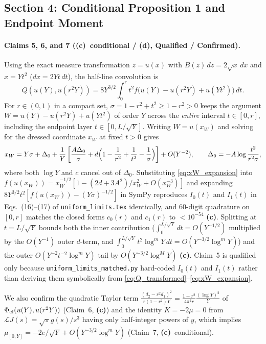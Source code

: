 \documentclass[11pt,a4paper]{article}
\newcommand{\C}{\textbf{(c)}}
\newcommand{\D}{\textbf{(d)}}
\newcommand{\scr}[1]{\texttt{#1}}
\begin{document}
\subsection{Section 4: Conditional Proposition 1 and Endpoint Moment}
\paragraph{Claims 5, 6, and 7 (\C\ conditional / \D, Qualified / Confirmed).}
Using the exact measure transformation $z=u(x)$ with $B(z)\,dz=2\sqrt{x}\,dx$
and $x=Yt^2$ ($dx=2Yt\,dt$), the half-line convolution is
\begin{equation}
 Q(u(Y),u(r^2Y)) = 8Y^{3/2}\int_0^r t^2 f\bigl(u(Y)-u(r^2Y)+u(Yt^2)\bigr)\,dt. \label{eq:Q_transformed}
\end{equation}
For $r\in(0,1)$ in a compact set, $\sigma=1-r^2+t^2\ge 1-r^2>0$ keeps the
argument $W=u(Y)-u(r^2Y)+u(Yt^2)$ of order $Y$ across the \emph{entire}
interval $t\in[0,r]$, including the endpoint layer $t\in[0,L/\sqrt{Y}]$.
Writing $W=u(x_W)$ and solving for the dressed coordinate $x_W$ at fixed $t>0$
gives
\begin{equation}
 x_W = Y\sigma + \Delta_0 + \frac{1}{Y}\left[\frac{A\Delta_0}{\sigma} + d\Bigl(1-\frac{1}{r^2}+\frac{1}{t^2}-\frac{1}{\sigma}\Bigr)\right] + O(Y^{-2}), \qquad \Delta_0 = -A\log\frac{t^2}{r^2\sigma}, \label{eq:xW_expansion}
\end{equation}
where both $\log Y$ and $c$ cancel out of $\Delta_0$. Substituting
\eqref{eq:xW_expansion} into $f(u(x_W))=x_W^{-1/2}[1-(2d+3A^2)/x_W^2+O(x_W^{-3})]$
and expanding $8Y^{3/2}t^2[f(u(x_W))-(Y\sigma)^{-1/2}]$ in SymPy reproduces
$I_0(t)$ and $I_1(t)$ in Eqs.~(16)--(17) of \scr{uniform\_limits.tex}
identically, and 60-digit quadrature on $[0,r]$ matches the closed forms $c_0(r)$
and $c_1(r)$ to $<10^{-54}$ \C. Splitting at $t=L/\sqrt{Y}$ bounds both the
inner contribution ($\int_0^{L/\sqrt{Y}}dt=O(Y^{-1/2})$ multiplied by the
$O(Y^{-1})$ outer $d$-term, and $\int_0^{L/\sqrt{Y}}t^2\log^m Y\,dt=O(Y^{-3/2}\log^m Y)$)
and the outer $O(Y^{-2}t^{-2}\log^m Y)$ tail by $O(Y^{-3/2}\log^M Y)$ \C.
Claim~5 is qualified only because \scr{uniform\_limits\_matched.py} hard-coded
$I_0(t)$ and $I_1(t)$ rather than deriving them symbolically from
\eqref{eq:Q_transformed}--\eqref{eq:xW_expansion}.

We also confirm the quadratic Taylor term
$\frac{(d_2-r^2d_1)^2}{r(1-r^2)Y}=\frac{1-r^2}{4\pi^2 r}\frac{(\log Y)^2}{Y}$ of
$\Phi_{\rm cl}(u(Y),u(r^2Y))$ (Claim~6, \C) and the identity $K=-2\mu=0$ from
$\mathcal L J(s)=\sqrt{\pi}g(s)/s^3$ having only half-integer powers of $y$,
which implies $\mu_{[0,Y]}=-2e/\sqrt{Y}+O(Y^{-3/2}\log^m Y)$ (Claim~7, \C\
conditional).
\end{document}
